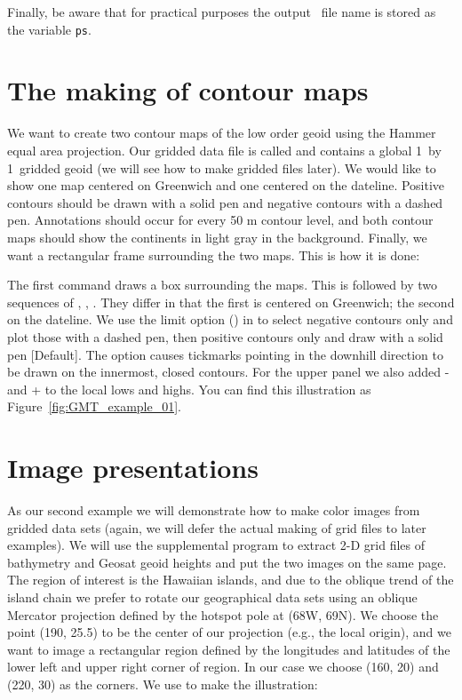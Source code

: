 Finally, be aware that for practical purposes the output \PS\ file name is stored as the variable \texttt{ps}.

\section{The making of contour maps}


We want to create two contour maps of the low order geoid
using the Hammer equal area projection.  Our gridded data
file is called  and contains a global 1\DS\ 
by 1\DS\ gridded geoid (we will see how to make gridded
files later).  We would like to show one map centered on
Greenwich and one centered on the dateline.  Positive contours
should be drawn with a solid pen and negative contours with
a dashed pen.  Annotations should occur for every 50 m contour
level, and both contour maps should show the continents in
light gray in the background.  Finally, we want a rectangular
frame surrounding the two maps.  This is how it is done:


The first command draws a box surrounding the maps.  This is
followed by two sequences of
, , .
They differ in that the first is centered on Greenwich; the
second on the dateline.  We use the limit option ()
in  to select negative contours only and plot
those with a dashed pen, then positive contours only and draw
with a solid pen [Default].  The  option causes tickmarks
pointing in the downhill direction to be drawn on the innermost,
closed contours.  For the upper panel we also added - and + to
the local lows and highs.  You can find this illustration as
Figure~\ref{fig:GMT_example_01}.



\section{Image presentations}
\label{sec:example_02}

As our second example we will demonstrate how to make color
images from gridded data sets (again, we will defer the
actual making of grid files to later examples).  We will
use the supplemental program  to extract 2-D
grid files of bathymetry and Geosat geoid heights and put the
two images on the same page.  The region of interest is the
Hawaiian islands, and due to the oblique trend of the island
chain we prefer to rotate our geographical data sets using
an oblique Mercator projection defined by the hotspot pole
at (68\DS W, 69\DS N).  We choose the point (190\DS ,
25.5\DS ) to be the center of our projection (e.g., the
local origin), and we want to image a rectangular region
defined by the longitudes and latitudes of the lower left
and upper right corner of region.  In our case we choose
(160\DS , 20\DS ) and (220\DS , 30\DS ) as the
corners.  We use  to make the illustration:

